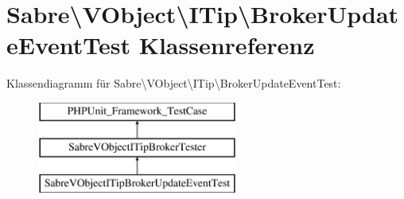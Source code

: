 \hypertarget{class_sabre_1_1_v_object_1_1_i_tip_1_1_broker_update_event_test}{}\section{Sabre\textbackslash{}V\+Object\textbackslash{}I\+Tip\textbackslash{}Broker\+Update\+Event\+Test Klassenreferenz}
\label{class_sabre_1_1_v_object_1_1_i_tip_1_1_broker_update_event_test}
Klassendiagramm für Sabre\textbackslash{}V\+Object\textbackslash{}I\+Tip\textbackslash{}Broker\+Update\+Event\+Test\+:\begin{figure}[H]
\begin{center}
\leavevmode
\includegraphics[height=3.000000cm]{class_sabre_1_1_v_object_1_1_i_tip_1_1_broker_update_event_test}
\end{center}
\end{figure}
